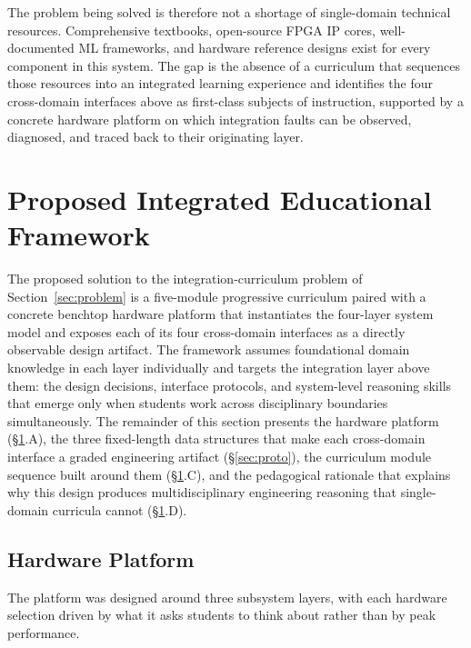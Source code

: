 \documentclass[conference]{IEEEtran}
\begin{document}
The problem being solved is therefore not a shortage of single-domain technical resources. Comprehensive textbooks, open-source FPGA IP cores, well-documented ML frameworks, and hardware reference designs exist for every component in this system. The gap is the absence of a curriculum that sequences those resources into an integrated learning experience and identifies the four cross-domain interfaces above as first-class subjects of instruction, supported by a concrete hardware platform on which integration faults can be observed, diagnosed, and traced back to their originating layer.

\section{Proposed Integrated Educational Framework}\label{sec:framework}

The proposed solution to the integration-curriculum problem of Section~\ref{sec:problem} is a five-module progressive curriculum paired with a concrete benchtop hardware platform that instantiates the four-layer system model and exposes each of its four cross-domain interfaces as a directly observable design artifact. The framework assumes foundational domain knowledge in each layer individually and targets the integration layer above them: the design decisions, interface protocols, and system-level reasoning skills that emerge only when students work across disciplinary boundaries simultaneously. The remainder of this section presents the hardware platform (\S\ref{sec:framework}.A), the three fixed-length data structures that make each cross-domain interface a graded engineering artifact (\S\ref{sec:proto}), the curriculum module sequence built around them (\S\ref{sec:framework}.C), and the pedagogical rationale that explains why this design produces multidisciplinary engineering reasoning that single-domain curricula cannot (\S\ref{sec:framework}.D).

\subsection{Hardware Platform}

The platform was designed around three subsystem layers, with each hardware selection driven by what it asks students to think about rather than by peak performance.
\end{document}
